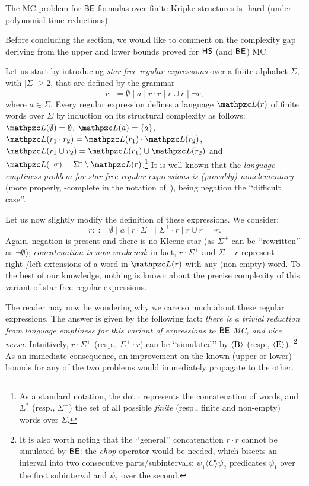 \begin{theorem}\label{theorem:lowerBoundBE} The MC problem for $\mathsf{BE}$ formulas over finite Kripke structures is \EXPSPACE-hard (under polynomial-time reductions).
\end{theorem}


Before concluding the section,
we would like to comment on the complexity gap deriving from the upper and lower bounds proved for $\text{\sffamily HS}$ (and $\mathsf{BE}$) MC.

Let us start by introducing \emph{star-free regular expressions} over a finite alphabet $\Sigma$, with $|\Sigma|\geq 2$, that are defined by the grammar
\[r::= \emptyset \mid a \mid r \cdot r \mid r \cup r \mid \neg r ,\]
where $a\in\Sigma$.
Every regular expression defines a language $\Lang(r)$ of finite words over $\Sigma$ by induction on its structural complexity
as follows:
   $\Lang(\emptyset)=\emptyset$,
   $\Lang(a)=\{a\}$,
   $\Lang(r_1\cdot r_2)=\Lang(r_1)\cdot \Lang(r_2)$,
   $\Lang(r_1\cup r_2)=\Lang(r_1)\cup \Lang(r_2)$ and
   $\Lang(\neg r)=\Sigma^*\setminus\Lang(r)$.\footnote{%
   As a standard notation, the dot $\cdot$ represents the concatenation of words, and $\Sigma^*$ (resp., $\Sigma^+$) the set of all possible \emph{finite} (resp., finite and non-empty) words over $\Sigma$.
   } 
It is well-known that the \emph{language-emptiness problem for star-free regular expressions is (provably) nonelementary}~\cite{Stockmeyer:1973,stockmeyer1974} (more properly, \TOWER-complete in the notation of~\cite{Schmitz:2016}), being negation the \lq\lq difficult case\rq\rq.

Let us now slightly modify the definition of these expressions. We consider:
\[r::= \emptyset \mid a \mid r \cdot \Sigma^+ \mid \Sigma^+\cdot r \mid r \cup r \mid \neg r .\]
Again, negation is present and there is no Kleene star (as $\Sigma^+$ can be \lq\lq rewritten\rq\rq{} as $\neg\emptyset$); \emph{concatenation is now weakened}: in fact, $r \cdot \Sigma^+$ and $\Sigma^+\cdot r$ represent right-/left-extensions of a word in $\Lang(r)$ with any (non-empty) word.
To the best of our knowledge, nothing is known about the precise complexity of this variant of star-free regular expressions.

The reader may now be wondering why we care so much about these regular expressions. The answer is given by the following fact:
\emph{there is a trivial reduction from language emptiness for this variant of expressions to $\mathsf{BE}$ MC, and vice versa}.
Intuitively, $r \cdot \Sigma^+$ (resp., $\Sigma^+\cdot r$) can be \lq\lq simulated\rq\rq{} by $\operatorname{\langle B\rangle}$ (resp., $\operatorname{\langle E\rangle}$).%
\footnote{It is also worth noting that the \lq\lq general\rq\rq{} concatenation $r\cdot r$ cannot be simulated by $\mathsf{BE}$: the \emph{chop} operator would be needed, which bisects an interval into two consecutive parts/subintervals: $\psi_1\langle C\rangle \psi_2$ predicates $\psi_1$ over the first subinterval and $\psi_2$ over the second.}
%
As an immediate consequence, an improvement on the known (upper or lower) bounds for any of the two problems would immediately propagate to the other.

